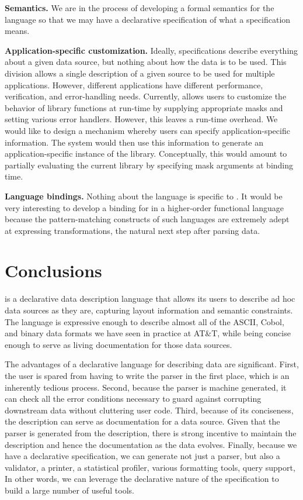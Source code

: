 \documentclass{sig-alternate}
\begin{document}
\textbf{Semantics.}  We are in the process of developing a formal semantics for the \pads{} language so that we may have a declarative specification of what a \pads{} specification means.

\textbf{Application-specific customization.}
Ideally, \pads{} specifications describe everything about a given
data source, but nothing about how the data is to be used. This
division allows a single description of a given source to be used
for multiple applications.  However, different applications have different
performance, verification, and error-handling needs.  Currently,
\pads{} allows users to customize the behavior of library
functions at run-time by supplying appropriate masks and setting various error handlers.  However, this leaves a run-time overhead.  We would like to 
design a mechanism whereby users can specify application-specific information.  The \pads{} system would then use this information to generate an 
application-specific instance of the library.  Conceptually, this would
amount to partially evaluating the current \pads{} library by specifying mask arguments at binding time.

\textbf{Language bindings.}  Nothing about the \pads{} language is specific to \C{}.  It would be very interesting to develop a binding for \pads{} in a higher-order functional language because the pattern-matching constructs of such languages are extremely adept at expressing transformations, the natural next step after parsing data.


\section{Conclusions}
\pads{} is a declarative data description language that allows 
its users to describe ad hoc data sources as they are, capturing
layout information and semantic constraints.  The language
is expressive enough to describe almost all of the ASCII, Cobol, 
and binary data formats we have seen in practice at AT\&T, while being 
concise enough to serve as living documentation for those data sources.  

The 
advantages of a declarative language for describing data are
significant.  First, the user is spared from having to write
the parser in the first place, which is an inherently tedious
process.   Second, because the parser is machine
generated, it can check all the error conditions necessary to
guard against corrupting downstream data without cluttering
user code.  Third, because of its conciseness, the \pads{}
description can serve as documentation for a data source.  Given
that the parser is generated from the description, there is 
strong incentive to maintain the description and hence the documentation
as the data evolves.  Finally, because we have a declarative
specification, we can generate not just a parser, but also
a validator, a printer, a statistical profiler, various formatting
tools, query support, \etc{}  In other words, we can leverage the declarative nature of the specification to build a large number of useful tools.
\end{document}
